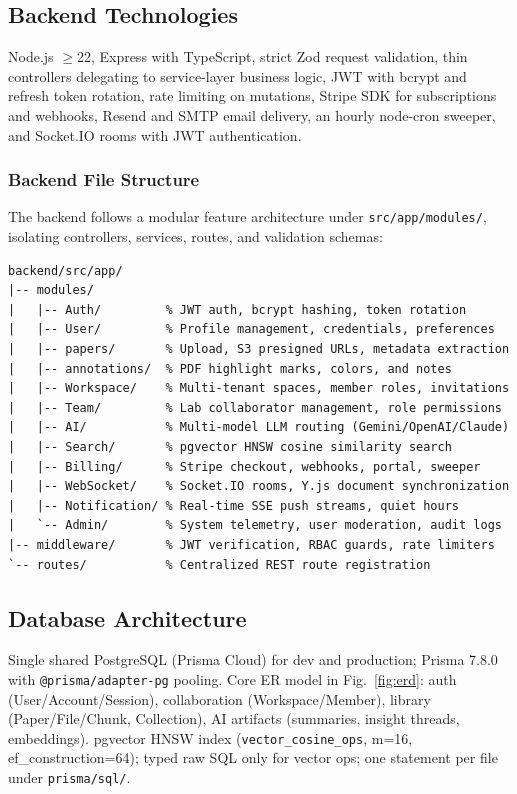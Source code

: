\subsection{Backend Technologies}
Node.js $\geq$22, Express with TypeScript, strict Zod request validation,
thin controllers delegating to service-layer business logic, JWT with
bcrypt and refresh token rotation, rate limiting on mutations, Stripe SDK
for subscriptions and webhooks, Resend and SMTP email delivery, an hourly
node-cron sweeper, and Socket.IO rooms with JWT authentication.

\subsubsection{Backend File Structure}
The backend follows a modular feature architecture under \texttt{src/app/modules/}, isolating controllers, services, routes, and validation schemas:

\begin{verbatim}
backend/src/app/
|-- modules/
|   |-- Auth/         % JWT auth, bcrypt hashing, token rotation
|   |-- User/         % Profile management, credentials, preferences
|   |-- papers/       % Upload, S3 presigned URLs, metadata extraction
|   |-- annotations/  % PDF highlight marks, colors, and notes
|   |-- Workspace/    % Multi-tenant spaces, member roles, invitations
|   |-- Team/         % Lab collaborator management, role permissions
|   |-- AI/           % Multi-model LLM routing (Gemini/OpenAI/Claude)
|   |-- Search/       % pgvector HNSW cosine similarity search
|   |-- Billing/      % Stripe checkout, webhooks, portal, sweeper
|   |-- WebSocket/    % Socket.IO rooms, Y.js document synchronization
|   |-- Notification/ % Real-time SSE push streams, quiet hours
|   `-- Admin/        % System telemetry, user moderation, audit logs
|-- middleware/       % JWT verification, RBAC guards, rate limiters
`-- routes/           % Centralized REST route registration
\end{verbatim}

\subsection{Database Architecture}
Single shared PostgreSQL (Prisma Cloud) for dev and production; Prisma 7.8.0
with \texttt{@prisma/adapter-pg} pooling. Core ER model in
Fig.~\ref{fig:erd}: auth (User/Account/Session), collaboration
(Workspace/Member), library (Paper/File/Chunk, Collection), AI artifacts
(summaries, insight threads, embeddings). pgvector HNSW index
(\texttt{vector\_cosine\_ops}, m=16, ef\_construction=64); typed raw SQL only
for vector ops; one statement per file under \texttt{prisma/sql/}.

